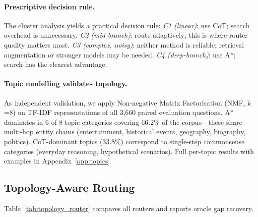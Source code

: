 \documentclass[11pt]{article}
\begin{document}
\paragraph{Prescriptive decision rule.}
The cluster analysis yields a practical decision rule: \emph{C1 (linear)}: use CoT; search overhead is unnecessary. \emph{C2 (mid-branch)}: route adaptively; this is where router quality matters most. \emph{C3 (complex, noisy)}: neither method is reliable; retrieval augmentation or stronger models may be needed. \emph{C4 (deep-branch)}: use A*; search has the clearest advantage.

\paragraph{Topic modelling validates topology.}
As independent validation, we apply Non-negative Matrix Factorisation (NMF, $k$=8) on TF-IDF representations of all 3,660 paired evaluation questions. A* dominates in 6 of 8 topic categories covering 66.2\% of the corpus---these share multi-hop entity chains (entertainment, historical events, geography, biography, politics). CoT-dominant topics (33.8\%) correspond to single-step commonsense categories (everyday reasoning, hypothetical scenarios). Full per-topic results with examples in Appendix~\ref{app:topics}.

\subsection{Topology-Aware Routing}
\label{sec:topology_routing}

Table~\ref{tab:topology_router} compares all routers and reports oracle gap recovery.
\end{document}
